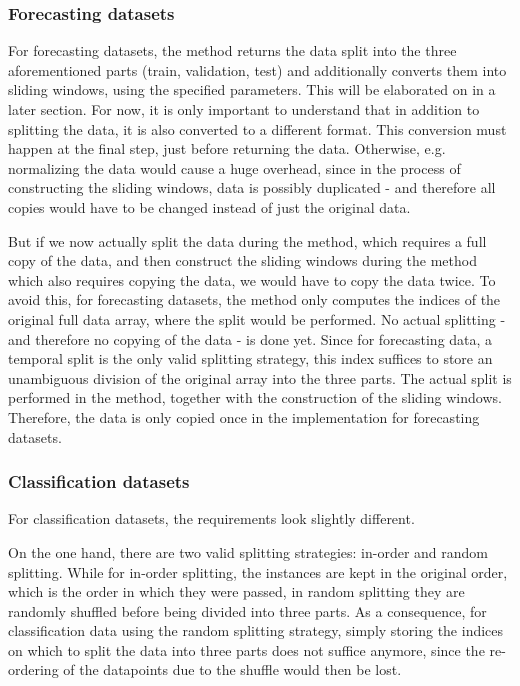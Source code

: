 \documentclass[review]{AIM_report}
\begin{document}
\subsubsection{Forecasting datasets}

For forecasting datasets, the \collectFore method returns the data split into the three aforementioned parts (train, validation, test) and additionally converts them into sliding windows, using the specified parameters. This will be elaborated on in a later section. For now, it is only important to understand that in addition to splitting the data, it is also converted to a different format. This conversion must happen at the final step, just before returning the data. Otherwise, e.g. normalizing the data would cause a huge overhead, since in the process of constructing the sliding windows, data is possibly duplicated - and therefore all copies would have to be changed instead of just the original data.

But if we now actually split the data during the \splitShort method, which requires a full copy of the data, and then construct the sliding windows during the \collect method which also requires copying the data, we would have to copy the data twice. To avoid this, for forecasting datasets, the \splitShort method only computes the indices of the original full data array, where the split would be performed. No actual splitting - and therefore no copying of the data - is done yet. Since for forecasting data, a temporal split is the only valid splitting strategy, this index suffices to store an unambiguous division of the original array into the three parts. The actual split is performed in the \collect method, together with the construction of the sliding windows. Therefore, the data is only copied once in the implementation for forecasting datasets.

\subsubsection{Classification datasets}

For classification datasets, the requirements look slightly different.

On the one hand, there are two valid splitting strategies: in-order and random splitting. While for in-order splitting, the instances are kept in the original order, which is the order in which they were passed, in random splitting they are randomly shuffled before being divided into three parts. As a consequence, for classification data using the random splitting strategy, simply storing the indices on which to split the data into three parts does not suffice anymore, since the re-ordering of the datapoints due to the shuffle would then be lost.
\end{document}
